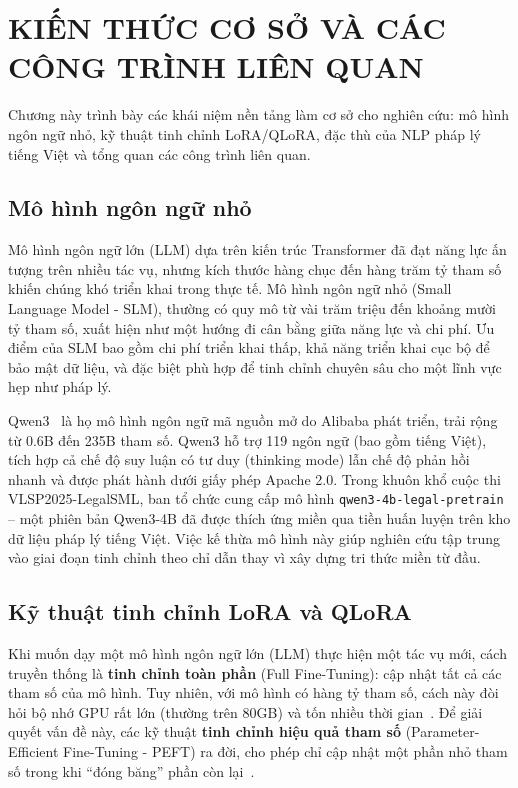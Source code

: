 \chapter{KIẾN THỨC CƠ SỞ VÀ CÁC CÔNG TRÌNH LIÊN QUAN}

Chương này trình bày các khái niệm nền tảng làm cơ sở cho nghiên cứu: mô hình ngôn ngữ nhỏ, kỹ thuật tinh chỉnh LoRA/QLoRA, đặc thù của NLP pháp lý tiếng Việt và tổng quan các công trình liên quan.

\section{Mô hình ngôn ngữ nhỏ}

Mô hình ngôn ngữ lớn (LLM) dựa trên kiến trúc Transformer đã đạt năng lực ấn tượng trên nhiều tác vụ, nhưng kích thước hàng chục đến hàng trăm tỷ tham số khiến chúng khó triển khai trong thực tế. Mô hình ngôn ngữ nhỏ (Small Language Model - SLM), thường có quy mô từ vài trăm triệu đến khoảng mười tỷ tham số, xuất hiện như một hướng đi cân bằng giữa năng lực và chi phí. Ưu điểm của SLM bao gồm chi phí triển khai thấp, khả năng triển khai cục bộ để bảo mật dữ liệu, và đặc biệt phù hợp để tinh chỉnh chuyên sâu cho một lĩnh vực hẹp như pháp lý.

Qwen3~\cite{yang2025qwen3} là họ mô hình ngôn ngữ mã nguồn mở do Alibaba phát triển, trải rộng từ 0.6B đến 235B tham số. Qwen3 hỗ trợ 119 ngôn ngữ (bao gồm tiếng Việt), tích hợp cả chế độ suy luận có tư duy (thinking mode) lẫn chế độ phản hồi nhanh và được phát hành dưới giấy phép Apache 2.0. Trong khuôn khổ cuộc thi VLSP2025-LegalSML, ban tổ chức cung cấp mô hình \texttt{qwen3-4b-legal-pretrain} -- một phiên bản Qwen3-4B đã được thích ứng miền qua tiền huấn luyện trên kho dữ liệu pháp lý tiếng Việt. Việc kế thừa mô hình này giúp nghiên cứu tập trung vào giai đoạn tinh chỉnh theo chỉ dẫn thay vì xây dựng tri thức miền từ đầu.

\section{Kỹ thuật tinh chỉnh LoRA và QLoRA}

Khi muốn dạy một mô hình ngôn ngữ lớn (LLM) thực hiện một tác vụ mới, cách truyền thống là \textbf{tinh chỉnh toàn phần} (Full Fine-Tuning): cập nhật tất cả các tham số của mô hình. Tuy nhiên, với mô hình có hàng tỷ tham số, cách này đòi hỏi bộ nhớ GPU rất lớn (thường trên 80GB) và tốn nhiều thời gian~\cite{hf_peft}. Để giải quyết vấn đề này, các kỹ thuật \textbf{tinh chỉnh hiệu quả tham số} (Parameter-Efficient Fine-Tuning - PEFT) ra đời, cho phép chỉ cập nhật một phần nhỏ tham số trong khi ``đóng băng'' phần còn lại~\cite{lightning_lora}.

